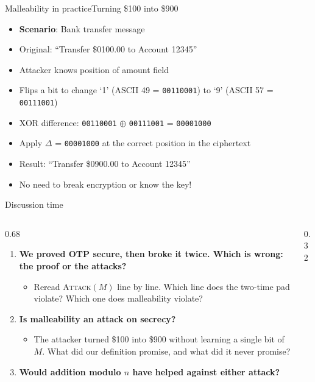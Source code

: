 \ifdefined\PRESENTATION\else\PassOptionsToClass{handout}{beamer}\fi\documentclass[aspectratio=169, lualatex]{beamer}
\begin{document}
\begin{frame}{Malleability in practice}{Turning \$100 into \$900}
	\begin{itemize}[<+->]
		\item \textbf{Scenario}: Bank transfer message
		\item Original: ``Transfer \$0100.00 to Account 12345''
		\item Attacker knows position of amount field
		\item Flips a bit to change `1' (ASCII 49 = \texttt{00110001}) to `9' (ASCII 57 = \texttt{00111001})
		\item XOR difference: \texttt{00110001} $\oplus$ \texttt{00111001} = \texttt{00001000}
		\item Apply $\Delta$ = \texttt{00001000} at the correct position in the ciphertext
		\item Result: ``Transfer \$0900.00 to Account 12345''
		\item \alert{No need to break encryption or know the key!}
	\end{itemize}
\end{frame}

\begin{frame}{Discussion time}
	\begin{columns}[c]
		\begin{column}{0.68\textwidth}
			\begin{enumerate}
				\item \textbf{We proved OTP secure, then broke it twice. Which is wrong: the proof or the attacks?}
				      \begin{itemize}
					      \item Reread \textsc{Attack}$(M)$ line by line. Which line does the two-time pad violate? Which one does malleability violate?
				      \end{itemize}
				\item \textbf{Is malleability an attack on secrecy?}
				      \begin{itemize}
					      \item The attacker turned \$100 into \$900 without learning a single bit of $M$. What did our definition promise, and what did it never promise?
				      \end{itemize}
				\item \textbf{Would addition modulo $n$ have helped against either attack?}
			\end{enumerate}
		\end{column}
		\begin{column}{0.32\textwidth}
		\end{column}
	\end{columns}
\end{frame}
\end{document}
